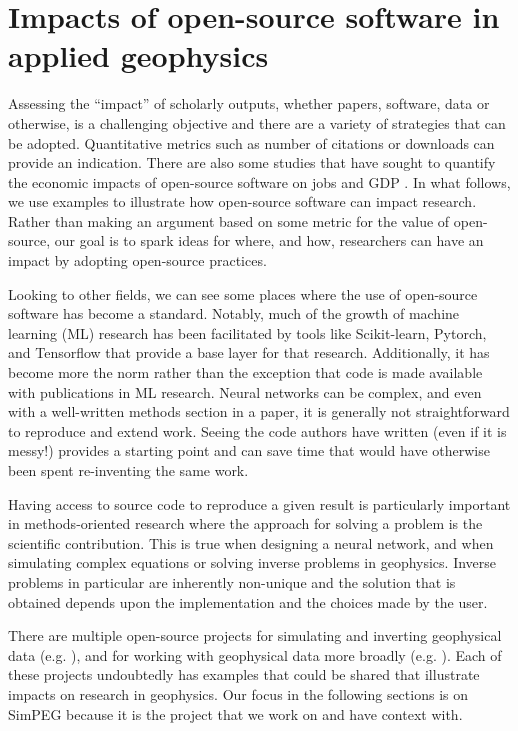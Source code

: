 \section{Impacts of open-source software in applied geophysics}

Assessing the ``impact'' of scholarly outputs, whether papers, software, data or otherwise, is a challenging objective and there are a variety of strategies that can be adopted. Quantitative metrics such as number of citations or downloads can provide an indication. There are also some studies that have sought to quantify the economic impacts of open-source software on jobs and GDP \citep{european_commission_impact_2021}. In what follows, we use examples to illustrate how open-source software can impact research. Rather than making an argument based on some metric for the value of open-source, our goal is to spark ideas for where, and how, researchers can have an impact by adopting open-source practices.

Looking to other fields, we can see some places where the use of open-source software has become a standard. Notably, much of the growth of machine learning (ML) research has been facilitated by tools like Scikit-learn, Pytorch, and Tensorflow that provide a base layer for that research. Additionally, it has become more the norm rather than the exception that code is made available with publications in ML research. Neural networks can be complex, and even with a well-written methods section in a paper, it is generally not straightforward to reproduce and extend work. Seeing the code authors have written (even if it is messy!) provides a starting point and can save time that would have otherwise been spent re-inventing the same work.

Having access to source code to reproduce a given result is particularly important in methods-oriented research where the approach for solving a problem is the scientific contribution. This is true when designing a neural network, and when simulating complex equations or solving inverse problems in geophysics. Inverse problems in particular are inherently non-unique and the solution that is obtained depends upon the implementation and the choices made by the user.

There are multiple open-source projects for simulating and inverting geophysical data (e.g. \cite{key_mare2dem_2016, Rucker2017, blanchy_resipy_2020, biondi_object-oriented_2021, mardan_pyfwi_2023}), and for working with geophysical data more broadly (e.g. \cite{Uieda2013, krieger_mtpy_2014, stanton_seismic_2016, warren_gprmax_2016, louboutin_devito_2019}). Each of these projects undoubtedly has examples that could be shared that illustrate impacts on research in geophysics. Our focus in the following sections is on SimPEG because it is the project that we work on and have context with.

